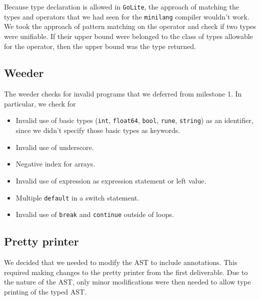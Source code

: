 \documentclass{article}
\begin{document}
Because type declaration is allowed in \verb|GoLite|, the approach of matching the types and operators that we had seen for the \verb|minilang| compiler wouldn't work. We took the approach of pattern matching on the operator and check if two types were unifiable. If their upper bound were belonged to the class of types allowable for the operator, then the upper bound was the type returned.

\subsection*{Weeder}
The weeder checks for invalid programs that we deferred from milestone 1. In particular, we check for
\begin{itemize}
	\item Invalid use of basic types (\verb|int|, \verb|float64|, \verb|bool|, \verb|rune|, \verb|string|) as an identifier, since we didn't specify those basic types as keywords.
	\item Invalid use of underscore.
	\item Negative index for arrays.
	\item Invalid use of expression as expression statement or left value.
	\item Multiple \verb|default| in a switch statement.
	\item Invalid use of \verb|break| and \verb|continue| outside of loops.
\end{itemize}

\subsection*{Pretty printer}
We decided that we needed to modify the AST to include annotations. This required making changes to the pretty printer from the first deliverable. Due to the nature of the AST, only minor modifications were then needed to allow type printing of the typed AST.
\end{document}
